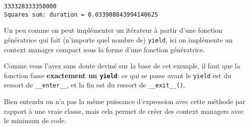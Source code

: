     \begin{Verbatim}[commandchars=\\\{\},frame=single,framerule=0.3mm,rulecolor=\color{cellframecolor}]
333328333350000
Squares sum: duration = 0.033908843994140625
\end{Verbatim}

    Un peu comme on peut implémenter un itérateur à partir d'une fonction
génératrice qui fait (n'importe quel nombre de) \texttt{yield}, ici on
implémente un context manager compact sous la forme d'une fonction
génératrice.

Comme vous l'avez sans doute deviné sur la base de cet exemple, il faut
que la fonction fasse \textbf{exactement un \texttt{yield}}: ce qui se
passe avant le \texttt{yield} est du ressort de \texttt{\_\_enter\_\_},
et la fin est du ressort de \texttt{\_\_exit\_\_()}.

Bien entendu on n'a pas la même puissance d'expression avec cette
méthode par rapport à une vraie classe, mais cela permet de créer des
context managers avec le minimum de code.


    
    
    
